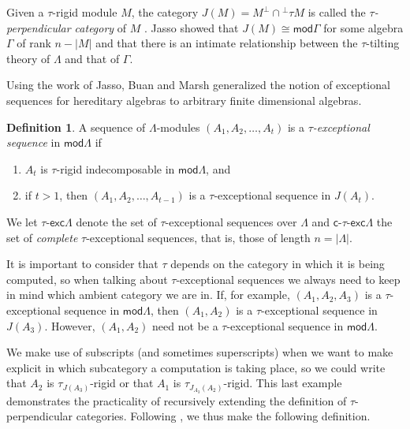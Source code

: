 \documentclass[11pt]{amsart}
\newcommand{\mods}{\mathsf{mod}}
\newcommand{\tauexc}[1]{\ensuremath{\tau\text{-}\mathsf{exc} #1}}
\newcommand{\ctauexc}[1]{\ensuremath{\mathsf{c}\text{-}\tau\text{-}\mathsf{exc} #1}}
\theoremstyle{definition}
\newtheorem{definition}[theorem]{Definition}
\begin{document}
Given a $\tau$-rigid module $M$, the category $J(M) = M^\perp \cap {}^\perp \tau M$ is called the \textit{$\tau$-perpendicular category} of $M$ \cite[Def. 3.3]{jassoreduction}. Jasso  \cite{jassoreduction} showed that $J(M) \cong \mods \Gamma$ for some algebra $\Gamma$ of rank $n-|M|$ and that there is an intimate relationship between the $\tau$-tilting theory of $\Lambda$ and that of $\Gamma$.

Using the work of Jasso, Buan and Marsh \cite{tauexceptional_buanmarsh} generalized the notion of exceptional sequences for hereditary algebras to arbitrary finite dimensional algebras.

\begin{definition}\cite[Def. 1.3]{tauexceptional_buanmarsh}
    A sequence of $\Lambda$-modules $(A_1,A_2,\dots,A_t)$ is a \textit{$\tau$-exceptional sequence }in $\mods\Lambda$ if
    
    \begin{enumerate}
        \item $A_t$ is $\tau$-rigid indecomposable in $\mods \Lambda$, and
        \item if $t > 1$, then $(A_1,A_2,\dots,A_{t-1})$ is a $\tau$-exceptional sequence in $J(A_t)$.
    \end{enumerate}
\end{definition}

We let $\tauexc{\Lambda}$ denote the set of $\tau$-exceptional sequences over $\Lambda$ and $\ctauexc{\Lambda}$ the set of \textit{complete} $\tau$-exceptional sequences, that is, those of length $n = |\Lambda|$. 

It is important to consider that $\tau$ depends on the category in which it is being computed, so when talking about $\tau$-exceptional sequences we always need to keep in mind which ambient category we are in. If, for example, $(A_1,A_2,A_3)$ is a $\tau$-exceptional sequence in $\mods \Lambda$, then $(A_1,A_2)$ is a $\tau$-exceptional sequence in $J(A_3)$. However, $(A_1,A_2)$ need not be a $\tau$-exceptional sequence in $\mods \Lambda$.

We make use of subscripts (and sometimes superscripts) when we want to make explicit in which subcategory a computation is taking place, so we could write that $A_2$ is $\tau_{J(A_3)}$-rigid or that $A_1$ is $\tau_{J_{A_3}(A_2)}$-rigid. This last example demonstrates the practicality of recursively extending the definition of $\tau$-perpendicular categories. Following \cite{BHM2024}, we thus make the following definition.
\end{document}
